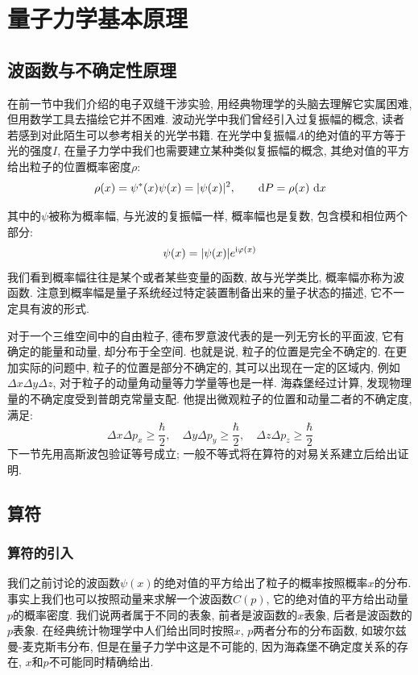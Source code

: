 \chapter{量子力学基本原理}
\section{波函数与不确定性原理}
在前一节中我们介绍的电子双缝干涉实验, 用经典物理学的头脑去理解它实属困难, 但用数学工具去描绘它并不困难. 波动光学中我们曾经引入过复振幅的概念, 读者若感到对此陌生可以参考相关的光学书籍. 在光学中复振幅$A$的绝对值的平方等于光的强度$I$, 在量子力学中我们也需要建立某种类似复振幅的概念, 其绝对值的平方给出粒子的位置概率密度$\rho$:
\[
\rho(x)=\psi^*(x)\psi(x)=|\psi(x)|^2,\qquad \mathop{}\!\mathrm{d} P=\rho(x)\,\mathop{}\!\mathrm{d} x
\]

其中的$\psi$被称为概率幅, 与光波的复振幅一样, 概率幅也是复数, 包含模和相位两个部分:
\[
\psi(x) = |\psi(x)|e^{\mathop{}\!\mathrm{i}\varphi(x)}
\]
我们看到概率幅往往是某个或者某些变量的函数, 故与光学类比, 概率幅亦称为波函数. 注意到概率幅是量子系统经过特定装置制备出来的量子状态的描述, 它不一定具有波的形式.

对于一个三维空间中的自由粒子, 德布罗意波代表的是一列无穷长的平面波, 它有确定的能量和动量, 却分布于全空间. 也就是说, 粒子的位置是完全不确定的. 在更加实际的问题中, 粒子的位置是部分不确定的, 其可以出现在一定的区域内, 例如$\Delta x\Delta y\Delta z$, 对于粒子的动量角动量等力学量等也是一样. 海森堡经过计算, 发现物理量的不确定度受到普朗克常量支配. 他提出微观粒子的位置和动量二者的不确定度, 满足:
\[
\Delta x \Delta p_x \geq \frac{\hbar}{2}, \quad \Delta y \Delta p_y \geq \frac{\hbar}{2}, \quad \Delta z \Delta p_z \geq \frac{\hbar}{2}
\]
下一节先用高斯波包验证等号成立; 一般不等式将在算符的对易关系建立后给出证明.

\section{算符}
\subsection{算符的引入}
我们之前讨论的波函数$\psi(x)$的绝对值的平方给出了粒子的概率按照概率$x$的分布. 事实上我们也可以按照动量来求解一个波函数$C(p)$, 它的绝对值的平方给出动量$p$的概率密度. 我们说两者属于不同的表象, 前者是波函数的$x$表象, 后者是波函数的$p$表象. 在经典统计物理学中人们给出同时按照$x$, $p$两者分布的分布函数, 如玻尔兹曼-麦克斯韦分布, 但是在量子力学中这是不可能的, 因为海森堡不确定度关系的存在, $x$和$p$不可能同时精确给出.

